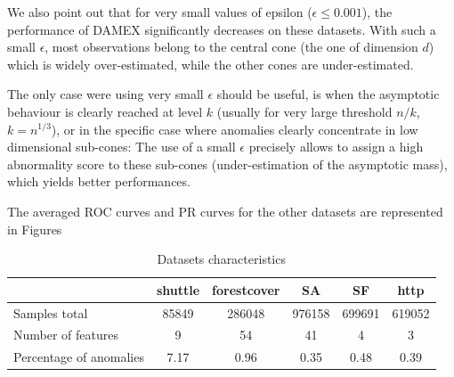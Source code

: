 We also point out that for very small values of epsilon ($\epsilon \le 0.001$),
the performance of DAMEX significantly decreases on these datasets.
With such a small $\epsilon$, most observations belong to the central cone
(the one of dimension $d$) which is widely over-estimated, while the other cones are under-estimated.%

The only case were using very small $\epsilon$ should be useful, is when the asymptotic behaviour is
clearly reached at level $k$ (usually for very large threshold $n/k$, \eg~$k=n^{1/3}$), or in the
specific case where anomalies clearly concentrate in low dimensional sub-cones: The use of a small $\epsilon$ precisely allows
to assign a high abnormality score to these sub-cones (under-estimation of the asymptotic mass), which yields better performances.


The averaged ROC curves and PR curves for the other datasets are represented in Figures
\begin{table}[!ht]
\caption{Datasets characteristics}
\label{jmva:table:data}
\centering
\begin{tabular}{lccccc}
  \toprule
   ~                   & shuttle & forestcover & SA     & SF     & http    \\
  \midrule
  Samples total        & 85849   & 286048      & 976158 & 699691 & 619052  \\
  Number of features   & 9       & 54          & 41     & 4      & 3       \\
  Percentage of anomalies & 7.17    & 0.96        & 0.35   & 0.48   & 0.39 \\
\bottomrule
\end{tabular}
\end{table}

